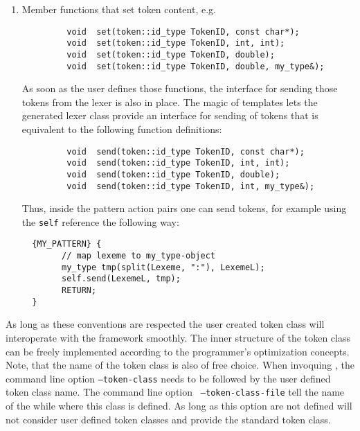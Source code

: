 \begin{enumerate}
     \item Member functions that set token content, e.g.
      \begin{verbatim}
         void  set(token::id_type TokenID, const char*);
         void  set(token::id_type TokenID, int, int);
         void  set(token::id_type TokenID, double);
         void  set(token::id_type TokenID, double, my_type&);
      \end{verbatim}
       As soon as the user defines those functions, the interface
       for sending those tokens  
       from the lexer is also in place. The magic of templates
       lets the generated lexer class provide an interface
       for sending of tokens that is equivalent to the 
       following function definitions:
      \begin{verbatim}
         void  send(token::id_type TokenID, const char*);
         void  send(token::id_type TokenID, int, int);
         void  send(token::id_type TokenID, double);
         void  send(token::id_type TokenID, int, my_type&);
      \end{verbatim}
       Thus, inside the pattern action pairs one can send tokens,
       for example using the {\tt self} reference the following way:
       \begin{lstlisting}
  {MY_PATTERN} {
        // map lexeme to my_type-object
        my_type tmp(split(Lexeme, ":"), LexemeL); 
        self.send(LexemeL, tmp);
        RETURN;
  }
       \end{lstlisting}

\end{enumerate}

As long as these conventions are respected the user created token class will
interoperate with the framework smoothly. The inner structure of the token
class can be freely implemented according to the programmer's optimization
concepts. Note, that the name of the token class is also of free choice.  When
invoquing {\quex}, the command line option {\tt --token-class} needs to be
followed by the user defined token class name. The command line option {\tt
  --token-class-file} tell {\quex} the name of the while where this class is
defined. As long as this option are not defined {\quex} will not consider
user defined token classes and provide the standard token class.


